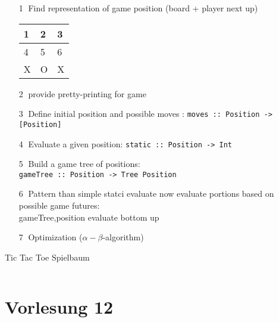 \documentclass{article}
\newcommand{\Haskell}[1]{\texttt{#1}}
\begin{document}
\begin{enumerate}
\item[\textcircled{1}] Find representation of game position (board + player next up)\\
\begin{tabular}{|l|l|l|}
\hline
1&2&3 \\ \hline
4&5&6 \\ \hline
X&O&X \\ \hline
\end{tabular}
\item[\textcircled{2}]provide pretty-printing for game
\item[\textcircled{3}]Define initial position and possible moves : \Haskell{moves :: Position -> [Position]}
\item[\textcircled{4}] Evaluate a given position: \Haskell{static :: Position -> Int}
\item[\textcircled{5}] Build a game tree of positions:\\
\Haskell{gameTree :: Position -> Tree Position}
\item[\textcircled{6}] Pattern than simple statci evaluate now evaluate portions based on possible game futures:\\
gameTree,position evaluate bottom up
\item[\textcircled{7}] Optimization ($\alpha-\beta$-algorithm)
\end{enumerate}
\begin{listing}
\caption{Tic Tac Toe Spielbaum}
\inputminted{Haskell}{tic-tac-toe.hs}
\end{listing}
\clearpage
\section{Vorlesung 12}
\end{document}
